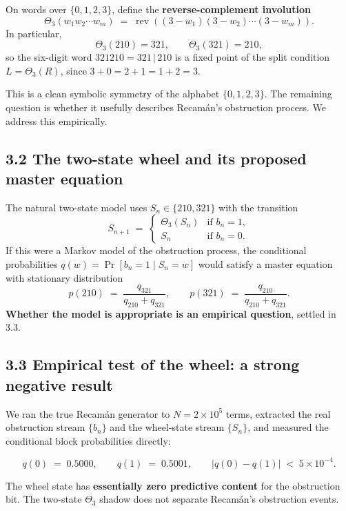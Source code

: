 \documentclass[
  11pt,
]{article}
\begin{document}
On words over \(\{0,1,2,3\}\), define the \textbf{reverse-complement
involution} \[
\Theta_3(w_1 w_2 \cdots w_m) \;=\; \operatorname{rev}\!\left((3 - w_1)(3 - w_2) \cdots (3 - w_m)\right).
\] In particular, \[
\Theta_3(210) = 321, \qquad \Theta_3(321) = 210,
\] so the six-digit word \(321210 = 321\,|\,210\) is a fixed point of
the split condition \(L = \Theta_3(R)\), since \(3+0 = 2+1 = 1+2 = 3\).

This is a clean symbolic symmetry of the alphabet \(\{0,1,2,3\}\). The
remaining question is whether it usefully describes Recamán's
obstruction process. We address this empirically.

\hypertarget{the-two-state-wheel-and-its-proposed-master-equation}{%
\subsection{3.2 The two-state wheel and its proposed master
equation}\label{the-two-state-wheel-and-its-proposed-master-equation}}

The natural two-state model uses \(S_n \in \{210, 321\}\) with the
transition \[
S_{n+1} \;=\; \begin{cases} \Theta_3(S_n) & \text{if } b_n = 1, \\ S_n & \text{if } b_n = 0. \end{cases}
\] If this were a Markov model of the obstruction process, the
conditional probabilities \(q(w) = \Pr[b_n = 1 \mid S_n = w]\) would
satisfy a master equation with stationary distribution \[
p(210) \;=\; \frac{q_{321}}{q_{210} + q_{321}}, \qquad p(321) \;=\; \frac{q_{210}}{q_{210} + q_{321}}.
\] \textbf{Whether the model is appropriate is an empirical question},
settled in 3.3.

\hypertarget{empirical-test-of-the-wheel-a-strong-negative-result}{%
\subsection{3.3 Empirical test of the wheel: a strong negative
result}\label{empirical-test-of-the-wheel-a-strong-negative-result}}

We ran the true Recamán generator to \(N = 2 \times 10^5\) terms,
extracted the real obstruction stream \(\{b_n\}\) and the wheel-state
stream \(\{S_n\}\), and measured the conditional block probabilities
directly:

\[
q(0) \;=\; 0.5000, \qquad q(1) \;=\; 0.5001, \qquad |q(0) - q(1)| \;<\; 5 \times 10^{-4}.
\]

The wheel state has \textbf{essentially zero predictive content} for the
obstruction bit. The two-state \(\Theta_3\) shadow does not separate
Recamán's obstruction events.
\end{document}
